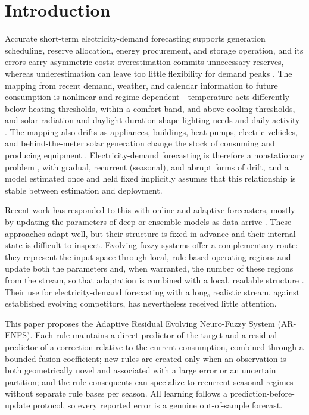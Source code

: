 \documentclass[preprint,12pt]{elsarticle}
\begin{document}
\section{Introduction}
\label{sec:introduction}

Accurate short-term electricity-demand forecasting supports generation scheduling, reserve allocation, energy procurement, and storage operation, and its errors carry asymmetric costs: overestimation commits unnecessary reserves, whereas underestimation can leave too little flexibility for demand peaks \citep{hong2016probabilistic,fan2012shortterm}. The mapping from recent demand, weather, and calendar information to future consumption is nonlinear and regime dependent---temperature acts differently below heating thresholds, within a comfort band, and above cooling thresholds, and solar radiation and daylight duration shape lighting needs and daily activity \citep{psiloglou2009factors}. The mapping also drifts as appliances, buildings, heat pumps, electric vehicles, and behind-the-meter solar generation change the stock of consuming and producing equipment \citep{kavousian2013determinants,yohanis2008reallife}. Electricity-demand forecasting is therefore a nonstationary problem \citep{gama2014survey}, with gradual, recurrent (seasonal), and abrupt forms of drift, and a model estimated once and held fixed implicitly assumes that this relationship is stable between estimation and deployment.

Recent work has responded to this with online and adaptive forecasters, mostly by updating the parameters of deep or ensemble models as data arrive \citep{fekri2021online,jagait2021load,azeem2025mitigating,devilmarest2024adaptive}. These approaches adapt well, but their structure is fixed in advance and their internal state is difficult to inspect. Evolving fuzzy systems offer a complementary route: they represent the input space through local, rule-based operating regions and update both the parameters and, when warranted, the number of these regions from the stream, so that adaptation is combined with a local, readable structure \citep{skrjanc2019survey,andonovski2026advancements}. Their use for electricity-demand forecasting with a long, realistic stream, against established evolving competitors, has nevertheless received little attention.

This paper proposes the Adaptive Residual Evolving Neuro-Fuzzy System (AR-ENFS). Each rule maintains a direct predictor of the target and a residual predictor of a correction relative to the current consumption, combined through a bounded fusion coefficient; new rules are created only when an observation is both geometrically novel and associated with a large error or an uncertain partition; and the rule consequents can specialize to recurrent seasonal regimes without separate rule bases per season. All learning follows a prediction-before-update protocol, so every reported error is a genuine out-of-sample forecast.
\end{document}
